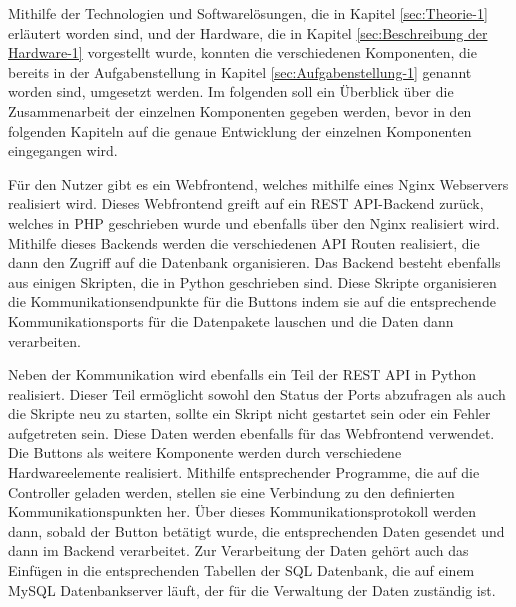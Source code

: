 Mithilfe der Technologien und Softwarelösungen, die in Kapitel \ref{sec:Theorie-1} erläutert worden sind, und der Hardware, die in Kapitel \ref{sec:Beschreibung der Hardware-1} vorgestellt wurde, konnten die verschiedenen Komponenten, die bereits in der Aufgabenstellung in Kapitel \ref{sec:Aufgabenstellung-1} genannt worden sind, umgesetzt werden. 
Im folgenden soll ein Überblick über die Zusammenarbeit der einzelnen Komponenten gegeben werden, bevor in den folgenden Kapiteln auf die genaue Entwicklung der einzelnen Komponenten eingegangen wird. 

Für den Nutzer gibt es ein Webfrontend, welches mithilfe eines Nginx Webservers realisiert wird. Dieses Webfrontend greift auf ein \ac{REST} \ac{API}-Backend zurück, welches in \ac{PHP} geschrieben wurde und ebenfalls über den Nginx realisiert wird. Mithilfe dieses Backends werden die verschiedenen \ac{API} Routen realisiert, die dann den Zugriff auf die Datenbank organisieren. Das Backend besteht ebenfalls aus einigen Skripten, die in Python geschrieben sind. Diese Skripte organisieren die Kommunikationsendpunkte für die Buttons indem sie auf die entsprechende Kommunikationsports für die Datenpakete lauschen und die Daten dann verarbeiten. 

Neben der Kommunikation wird ebenfalls ein Teil der \ac{REST} \ac{API} in Python realisiert. Dieser Teil ermöglicht sowohl den Status der Ports abzufragen als auch die Skripte neu zu starten, sollte ein Skript nicht gestartet sein oder ein Fehler aufgetreten sein. Diese Daten werden ebenfalls für das Webfrontend verwendet. 
Die Buttons als weitere Komponente werden durch verschiedene Hardwareelemente realisiert. Mithilfe entsprechender Programme, die auf die Controller geladen werden, stellen sie eine Verbindung zu den definierten Kommunikationspunkten her. Über dieses Kommunikationsprotokoll werden dann, sobald der Button betätigt wurde, die entsprechenden Daten gesendet und dann im Backend verarbeitet. 
Zur Verarbeitung der Daten gehört auch das Einfügen in die entsprechenden Tabellen der SQL Datenbank, die auf einem MySQL Datenbankserver läuft, der für die Verwaltung der Daten zuständig ist. 
